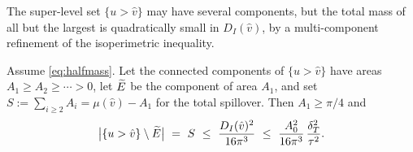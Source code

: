 The super-level set $\{u>\hat v\}$ may have several components, but the
total mass of all but the largest is quadratically small in $D_I(\hat v)$,
by a multi-component refinement of the isoperimetric inequality.

\begin{lemma}[Spillover]\label{lem:spill}
Assume \eqref{eq:halfmass}. Let the connected components of $\{u>\hat v\}$
have areas $A_1\ge A_2\ge\cdots>0$, let $\widetilde{E}$ be the component of area
$A_1$, and set $S:=\sum_{i\ge2}A_i=\mu(\hat v)-A_1$ for the total spillover.
Then $A_1\ge\pi/4$ and
\begin{equation}\label{eq:spill}
   \bigl|\{u>\hat v\}\setminus\widetilde{E}\bigr|
   \ =\ S\ \le\ \frac{D_I(\hat v)^2}{16\pi^3}
   \ \le\ \frac{A_0^2}{16\pi^3}\,\frac{\delta_T^2}{\tau^2}.
\end{equation}
\end{lemma}

